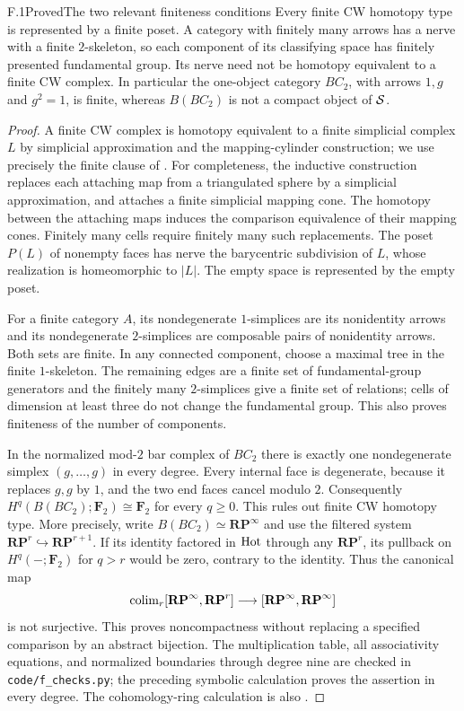 \begin{claim}{F.1}{Proved}{The two relevant finiteness conditions}
Every finite CW homotopy type is represented by a finite poset. A category
with finitely many arrows has a nerve with a finite $2$-skeleton, so each
component of its classifying space has finitely presented fundamental
group. Its nerve need not be homotopy equivalent to a finite CW complex.
In particular the one-object category $BC_2$, with arrows $1,g$ and
$g^2=1$, is finite, whereas $B(BC_2)$ is not a compact object of $\mathcal S$.
\end{claim}
\begin{proof}
A finite CW complex is homotopy equivalent to a finite simplicial complex
$L$ by simplicial approximation and the mapping-cylinder construction;
we use precisely the finite clause of \citet[Theorem~2C.5]{Hatcher2002}.
For completeness, the inductive construction replaces each attaching map
from a triangulated sphere by a simplicial approximation, and attaches a
finite simplicial mapping cone. The homotopy between the attaching maps
induces the comparison equivalence of their mapping cones. Finitely many
cells require finitely many such replacements. The poset $P(L)$ of
nonempty faces has nerve the barycentric subdivision of $L$, whose
realization is homeomorphic to $|L|$. The empty space is represented by
the empty poset.

For a finite category $A$, its nondegenerate $1$-simplices are its
nonidentity arrows and its nondegenerate $2$-simplices are composable
pairs of nonidentity arrows. Both sets are finite. In any connected
component, choose a maximal tree in the finite $1$-skeleton. The remaining
edges are a finite set of fundamental-group generators and the finitely
many $2$-simplices give a finite set of relations; cells of dimension
at least three do not change the fundamental group. This also proves
finiteness of the number of components.

In the normalized mod-$2$ bar complex of $BC_2$ there is exactly one
nondegenerate simplex $(g,\ldots,g)$ in every degree. Every internal face
is degenerate, because it replaces $g,g$ by $1$, and the two end faces
cancel modulo $2$. Consequently $H^q(B(BC_2);\mathbf F_2)\cong\mathbf F_2$
for every $q\geq0$. This rules out finite CW homotopy type. More precisely,
write $B(BC_2)\simeq\mathbf {RP}^{\infty}$ and use the filtered system
$\mathbf {RP}^{r}\hookrightarrow\mathbf {RP}^{r+1}$. If its identity
factored in $\mathrm{Hot}$ through any $\mathbf {RP}^{r}$, its pullback on
$H^q(-;\mathbf F_2)$ for $q>r$ would be zero, contrary to the identity.
Thus the canonical map
\[
 \operatorname{colim}_r[\mathbf {RP}^{\infty},\mathbf {RP}^{r}]
 \longrightarrow
 [\mathbf {RP}^{\infty},\mathbf {RP}^{\infty}]
\]
is not surjective. This proves noncompactness without replacing a
specified comparison by an abstract bijection. The multiplication table,
all associativity equations, and normalized boundaries through degree
nine are checked in \texttt{code/f\_checks.py}; the preceding symbolic
calculation proves the assertion in every degree. The cohomology-ring
calculation is also \citet[Theorem~3.19]{Hatcher2002}.
\end{proof}

